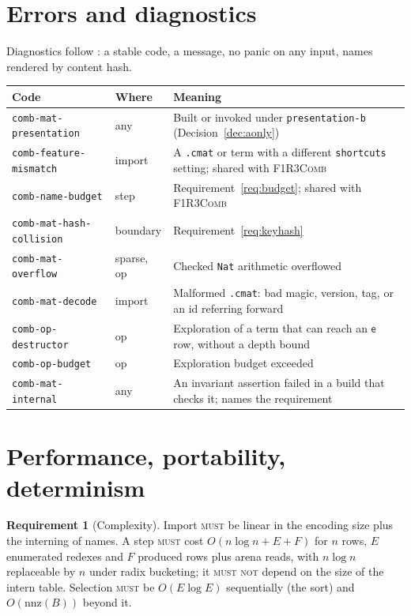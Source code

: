 \documentclass[11pt,a4paper]{article}
\newcommand{\code}[1]{\texttt{#1}}
\newcommand{\Comb}{\textsc{F1R3Comb}}
\newcommand{\MUST}{\textsc{must}}
\newcommand{\MUSTNOT}{\textsc{must not}}
\newcommand{\ev}{\mathsf{e}}
\theoremstyle{definition}
\newtheorem{requirement}[definition]{Requirement}
\theoremstyle{plain}
\begin{document}
\section{Errors and diagnostics}\label{sec:errors}

Diagnostics follow \cite[Req.~11.1]{combspec}: a stable code, a message, no
panic on any input, names rendered by content hash.

\begin{center}
\begin{tabularx}{\linewidth}{@{}ll>{\raggedright\arraybackslash}X@{}}
\toprule
Code & Where & Meaning\\
\midrule
\code{comb-mat-presentation} & any & Built or invoked under
\code{presentation-b} (Decision~\ref{dec:aonly})\\
\code{comb-feature-mismatch} & import & A \code{.cmat} or term with a
different \code{shortcuts} setting; shared with \Comb\\
\code{comb-name-budget} & step & Requirement~\ref{req:budget}; shared with
\Comb\\
\code{comb-mat-hash-collision} & boundary & Requirement~\ref{req:keyhash}\\
\code{comb-mat-overflow} & sparse, op & Checked \code{Nat} arithmetic
overflowed\\
\code{comb-mat-decode} & import & Malformed \code{.cmat}: bad magic,
version, tag, or an id referring forward\\
\code{comb-op-destructor} & op & Exploration of a term that can reach an
$\ev$ row, without a depth bound\\
\code{comb-op-budget} & op & Exploration budget exceeded\\
\code{comb-mat-internal} & any & An invariant assertion failed in a build
that checks it; names the requirement\\
\bottomrule
\end{tabularx}
\end{center}

\section{Performance, portability, determinism}\label{sec:perf}

\begin{requirement}[Complexity]\label{req:complexity}
Import \MUST{} be linear in the encoding size plus the interning of names.
A step \MUST{} cost $O(n \log n + E + F)$ for $n$ rows, $E$ enumerated
redexes and $F$ produced rows plus arena reads, with $n \log n$ replaceable
by $n$ under radix bucketing; it \MUSTNOT{} depend on the size of the intern
table. Selection \MUST{} be $O(E \log E)$ sequentially (the sort) and
$O(\mathrm{nnz}(B))$ beyond it.
\end{requirement}
\end{document}
